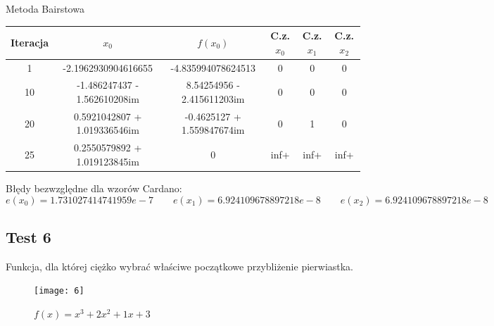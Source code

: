 \documentclass[a4paper]{article}
\begin{document}
    \begin{center}
        Metoda Bairstowa
    \end{center}
    \begin{center}
        \begin{tabular}{|c|c|c|c|c|c|} 
            \hline
            Iteracja & $x_0$ & $f(x_0)$ & C.z. $x_0$ & C.z. $x_1$ & C.z. $x_2$ \\
            \hline
            1 & -2.1962930904616655 & -4.835994078624513 & 0 & 0 & 0 \\ 
            \hline
            10 & -1.486247437 - 1.562610208im & 8.54254956 - 2.415611203im & 0 & 0 & 0 \\ 
            \hline
            20 & 0.5921042807 + 1.019336546im & -0.4625127 + 1.559847674im & 0 & 1 & 0 \\
            \hline
            25 & 0.2550579892 + 1.019123845im & 0 & inf+ & inf+ & inf+ \\
            \hline
        \end{tabular}
    \end{center}

    \vspace{5mm}

    \begin{center}
        Błędy bezwzględne dla wzorów Cardano:
        \[
            e(x_0) = 1.731027414741959e-7 \qquad e(x_1) = 6.924109678897218e-8 \qquad e(x_2) = 6.924109678897218e-8
        \]
    \end{center}    

\newpage
\subsection{Test 6}
Funkcja, dla której ciężko wybrać właściwe początkowe przybliżenie pierwiastka.
    \begin{figure}[h]
        \centering
        \texttt{[image: 6]}
        \caption{$f(x) = x^3 + 2x^2 + 1x + 3$}
    \end{figure}
\end{document}
